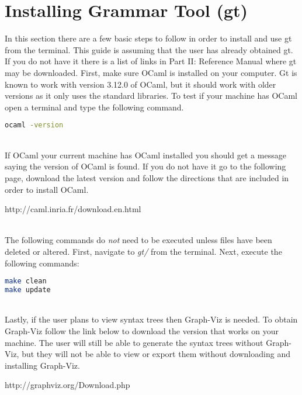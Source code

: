 \section{Installing Grammar Tool (gt)}

In this section there are a few basic steps to follow in order to install
and use gt from the terminal. This guide is assuming that 
the user has already obtained gt. If you do not have it there is a list
of links in Part II: Reference Manual where gt may be downloaded. First, make sure OCaml 
is installed on your computer. Gt is known to work with version 3.12.0 of OCaml, but it should work
with older versions as it only uses the standard libraries. To test if your machine has 
OCaml open a terminal and type the following command.\\

\begin{lstlisting}[language=bash]
ocaml -version
\end{lstlisting}\ \\
\noindent If OCaml your current machine has OCaml installed you should get a message saying
the version of OCaml is found. If you do not have it go to the following page, download the latest 
version and follow the directions that are included in order to install OCaml. \\

\begin{minipage}[t]{.8\linewidth}
http://caml.inria.fr/download.en.html
\end{minipage}\\

\noindent The following commands do \emph{not} need to be executed unless files have been 
deleted or altered. First, navigate to \textit{gt/} from the terminal. Next, execute the following 
commands: \\

\begin{lstlisting}[language=bash]
make clean 
make update 
\end{lstlisting}\ \\
\noindent Lastly, if the user plans to view syntax trees then Graph-Viz
is needed. To obtain Graph-Viz follow the link below to download
the version that works on your machine. The user will still be able
to generate the syntax trees without Graph-Viz, but they will not
be able to view or export them without downloading and installing Graph-Viz. \\

\begin{minipage}[t]{.8\linewidth}
http://graphviz.org/Download.php
\end{minipage}\\

